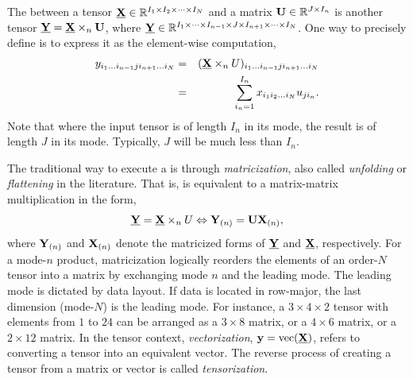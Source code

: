 The \TTM between a tensor $\T{X} \in \R^{I_1 \times I_2 \times \cdots \times I_N}$ and a matrix $\M{U} \in \R^{J \times I_n}$ is another tensor $\T{Y} = \T{X} \times_n \M{U}$, where $\T{Y} \in \R^{I_1 \times \dots \times I_{n-1} \times J \times I_{n+1} \times \cdots \times I_N}$.
One way to precisely define \TTM is to express it as the element-wise computation,
\begin{eqnarray}
  y_{i_1 \dots i_{n-1} j i_{n+1} \dots i_N}
    & = & (\T{X} \times_n U)_{i_1 \dots i_{n-1} j i_{n+1} \dots i_N} \nonumber \\
    & = & \sum_{i_n=1}^{I_n} x_{i_1 i_2 \dots i_N} u_{ji_n}.
  \label{eq:moden-ele}
\end{eqnarray}
Note that where the input tensor  is of length $I_n$ in its  mode, the result  is of length $J$ in its  mode.
Typically, $J$ will be much less than $I_n$.


The traditional way to execute a \TTM is through \emph{matricization}, also called \emph{unfolding} or \emph{flattening} in the literature.
That is, \TTM is equivalent to a matrix-matrix multiplication in the form,
%
\begin{equation}\label{eq:moden-mat}
  \T{Y} = \T{X} \times_n U \Leftrightarrow \M{Y}_{(n)} = \M{U} \M{X}_{(n)},
\end{equation}
%
where $\M{Y}_{(n)}$ and $\M{X}_{(n)}$ denote the matricized forms of $\T{Y}$ and $\T{X}$, respectively.
For a mode-$n$ product, matricization logically reorders the elements of an order-$N$ tensor into a matrix by exchanging mode $n$ and the leading mode.
The leading mode is dictated by data layout. If data is located in row-major, the last dimension (mode-$N$) is the leading mode.
For instance, a $3 \times 4 \times 2$ tensor with elements from $1$ to $24$ can be arranged as a $3 \times 8$ matrix, or a $4 \times 6$ matrix, or a $2 \times 12$ matrix.
In the tensor context, \emph{vectorization}, $\V{y} = \makeVec(\T{X})$, refers to converting a tensor into an equivalent vector.
The reverse process of creating a tensor from a matrix or vector is called \emph{tensorization}.

